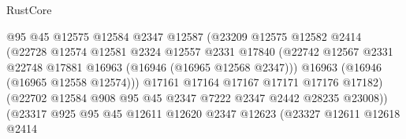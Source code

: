 \begin{lexlean}{RustCore}
\begin{coremodule}
                                      @95
                                      @45
                                      @12575
                                      @12584
                                      @2347
                                      @12587
                                      (@23209
                                        @12575
                                        @12582
                                        @2414
                                        (@22728
                                          @12574
                                          @12581
                                          @2324
                                          @12557
                                          @2331
                                          @17840
                                          (@22742
                                            @12567
                                            @2331
                                            @22748
                                            @17881
                                            @16963
                                            (@16946 (@16965 @12568 @2347)))
                                          @16963
                                          (@16946 (@16965 @12558 @12574)))
                                        @17161
                                        @17164
                                        @17167
                                        @17171
                                        @17176
                                        @17182)
                                      (@22702
                                        @12584
                                        @908
                                        @95
                                        @45
                                        @2347
                                        @7222
                                        @2347
                                        @2442
                                        @28235
                                        @23008))
                                    (@23317
                                      @925
                                      @95
                                      @45
                                      @12611
                                      @12620
                                      @2347
                                      @12623
                                      (@23327
                                        @12611
                                        @12618
                                        @2414

\end{coremodule}
\end{lexlean}
